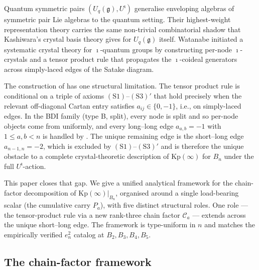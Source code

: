 \documentclass[11pt]{article}
\theoremstyle{definition}
\theoremstyle{remark}
\newcommand{\Kp}{\mathrm{Kp}}
\newcommand{\g}{\mathfrak{g}}
\newcommand{\Uq}{U_q(\g)}
\newcommand{\Uiota}{U^\imath}
\newcommand{\Cmid}{\mathcal{C}}
\begin{document}
Quantum symmetric pairs $(\Uq, \Uiota)$ generalise enveloping algebras of symmetric pair Lie
algebras to the quantum setting. Their highest-weight representation theory carries the same
non-trivial combinatorial shadow that Kashiwara's crystal basis theory gives for $\Uq$ itself.
Watanabe \cite{Watanabe2107,Watanabe2110} initiated a systematic crystal theory for $\imath$-quantum
groups by constructing per-node $\imath$-crystals and a tensor product rule that propagates the
$\imath$-coideal generators across simply-laced edges of the Satake diagram.

The construction of \cite{Watanabe2110} has one structural limitation. The tensor product rule
is conditional on a triple of axioms $(\mathrm{S1})$--$(\mathrm{S3})'$ that hold precisely when
the relevant off-diagonal Cartan entry satisfies $a_{ij} \in \{0, -1\}$, i.e., on simply-laced
edges. In the BDI family (type B, split), every node is split and so per-node objects come
from \cite[\S4.1]{Watanabe2110} uniformly, and every long--long edge $a_{a,b} = -1$ with
$1 \leq a, b < n$ is handled by \cite[Prop.~5.1.1]{Watanabe2110}. The unique remaining edge
is the short--long edge $a_{n-1,n} = -2$, which is excluded by $(\mathrm{S1})$--$(\mathrm{S3})'$
and is therefore the unique obstacle to a complete crystal-theoretic description of $\Kp(\infty)$
for $B_n$ under the full $\Uiota$-action.

This paper closes that gap. We give a unified analytical framework for the
chain-factor decomposition of $\Kp(\infty)|_{B_n}$, organised around a single
load-bearing scalar (the cumulative carry $P_a$), with five distinct structural
roles. One role --- the tensor-product rule via a new rank-three chain factor
$\Cmid_a$ --- extends \cite[Prop.~5.1.1]{Watanabe2110} across the unique
short--long edge. The framework is type-uniform in $n$ and matches the
empirically verified $e_n^2$ catalog at $B_2, B_3, B_4, B_5$.

\subsection{The chain-factor framework}\label{ssec:chain-factor-framework}
\end{document}
